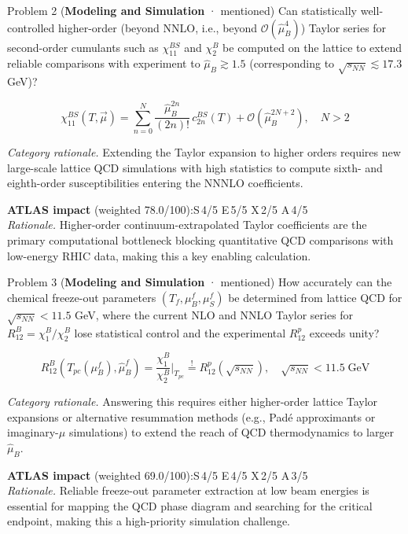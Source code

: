 \documentclass[11pt,letterpaper]{article}
\begin{document}
\begin{opbox}{Problem 2 \textnormal{\small(\textcolor{catModel}{\textbf{Modeling and Simulation}} · mentioned)}}
Can statistically well-controlled higher-order (beyond NNLO, i.e., beyond $\mathcal{O}(\hat{\mu}_B^4)$) Taylor series for second-order cumulants such as $\chi_{11}^{BS}$ and $\chi_2^B$ be computed on the lattice to extend reliable comparisons with experiment to $\hat{\mu}_B \gtrsim 1.5$ (corresponding to $\sqrt{s_{NN}} \lesssim 17.3$ GeV)?
\vspace{2pt}\begin{mathcap}\[\chi_{11}^{BS}(T,\vec{\mu}) = \sum_{n=0}^{N} \frac{\hat{\mu}_B^{2n}}{(2n)!}\,c_{2n}^{BS}(T) + \mathcal{O}(\hat{\mu}_B^{2N+2}),\quad N > 2\]\end{mathcap}
\vspace{3pt}
{\small\textit{Category rationale.} Extending the Taylor expansion to higher orders requires new large-scale lattice QCD simulations with high statistics to compute sixth- and eighth-order susceptibilities entering the NNNLO coefficients.}
\vspace{3pt}

{\footnotesize\textbf{ATLAS impact} (weighted 78.0/100):\quad S\,4/5 \quad E\,5/5 \quad X\,2/5 \quad A\,4/5\\
\textit{Rationale.} Higher-order continuum-extrapolated Taylor coefficients are the primary computational bottleneck blocking quantitative QCD comparisons with low-energy RHIC data, making this a key enabling calculation.}
\end{opbox}


\begin{opbox}{Problem 3 \textnormal{\small(\textcolor{catModel}{\textbf{Modeling and Simulation}} · mentioned)}}
How accurately can the chemical freeze-out parameters $(T_f, \mu_B^f, \mu_S^f)$ be determined from lattice QCD for $\sqrt{s_{NN}} < 11.5$ GeV, where the current NLO and NNLO Taylor series for $R_{12}^B = \chi_1^B/\chi_2^B$ lose statistical control and the experimental $R_{12}^p$ exceeds unity?
\vspace{2pt}\begin{mathcap}\[R_{12}^B(T_{pc}(\mu_B^f),\hat{\mu}_B^f) = \frac{\chi_1^B}{\chi_2^B}\bigg|_{T_{pc}} \stackrel{!}{=} R_{12}^p(\sqrt{s_{NN}}),\quad \sqrt{s_{NN}} < 11.5\;\text{GeV}\]\end{mathcap}
\vspace{3pt}
{\small\textit{Category rationale.} Answering this requires either higher-order lattice Taylor expansions or alternative resummation methods (e.g., Padé approximants or imaginary-$\mu$ simulations) to extend the reach of QCD thermodynamics to larger $\hat{\mu}_B$.}
\vspace{3pt}

{\footnotesize\textbf{ATLAS impact} (weighted 69.0/100):\quad S\,4/5 \quad E\,4/5 \quad X\,2/5 \quad A\,3/5\\
\textit{Rationale.} Reliable freeze-out parameter extraction at low beam energies is essential for mapping the QCD phase diagram and searching for the critical endpoint, making this a high-priority simulation challenge.}
\end{opbox}
\end{document}
